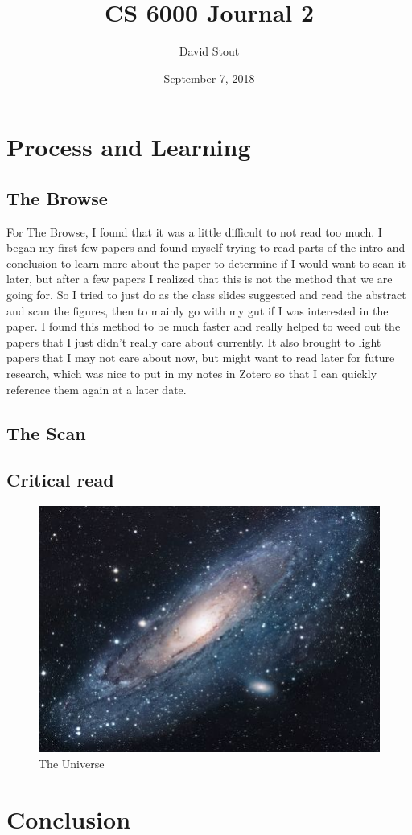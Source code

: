 \documentclass{article}
\title{CS 6000 Journal 2}
\author{David Stout}
\date{September 7, 2018}
\begin{document}
\maketitle

\section{Process and Learning}
\subsection{The Browse}
For The Browse, I found that it was a little difficult to not read too much. I began my first few papers and found myself trying to read parts of the intro and conclusion to learn more about the paper to determine if I would want to scan it later, but after a few papers I realized that this is not the method that we are going for. So I tried to just do as the class slides suggested and read the abstract and scan the figures, then to mainly go with my gut if I was interested in the paper. I found this method to be much faster and really helped to weed out the papers that I just didn't really care about currently. It also brought to light papers that I may not care about now, but might want to read later for future research, which was nice to put in my notes in Zotero so that I can quickly reference them again at a later date.
\subsection{The Scan}

\subsection{Critical read}

\begin{figure}[h!]
\centering
\includegraphics[scale=1.7]{universe}
\caption{The Universe}
\label{fig:universe}
\end{figure}

\section{Conclusion}

\clearpage
\nocite{*}


\end{document}

